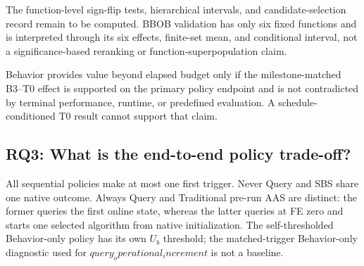  The function-level sign-flip tests, hierarchical
intervals, and candidate-selection record remain to be computed.  BBOB
validation has only six fixed functions and is interpreted through its six
effects, finite-set mean, and conditional interval, not a significance-based
reranking or function-superpopulation claim.

 Behavior provides value beyond elapsed budget only if
the milestone-matched B3--T0 effect is supported on the primary policy endpoint
and is not contradicted by terminal performance, runtime, or predefined evaluation.
A schedule-conditioned T0 result cannot support that claim.

\FloatBarrier

\subsection{RQ3: What is the end-to-end policy trade-off?}

All sequential policies make at most one first trigger.  Never Query and SBS
share one native outcome.  Always Query and Traditional pre-run AAS are distinct:
the former queries the first online state, whereas the latter queries at FE zero
and starts one selected algorithm from native initialization.  The
self-thresholded Behavior-only policy has its own $U_b$ threshold; the
matched-trigger Behavior-only diagnostic used for $query_operational_increment$ is not a baseline.


